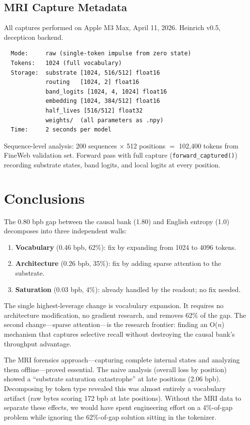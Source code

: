 \documentclass[11pt,a4paper]{report}
\begin{document}
\section{MRI Capture Metadata}

All captures performed on Apple M3 Max, April 11, 2026. Heinrich v0.5, decepticon backend.

\begin{verbatim}
  Mode:     raw (single-token impulse from zero state)
  Tokens:   1024 (full vocabulary)
  Storage:  substrate [1024, 516/512] float16
            routing   [1024, 2] float16
            band_logits [1024, 4, 1024] float16
            embedding [1024, 384/512] float16
            half_lives [516/512] float32
            weights/  (all parameters as .npy)
  Time:     2 seconds per model
\end{verbatim}

Sequence-level analysis: 200 sequences $\times$ 512 positions $=$ 102,400 tokens from FineWeb validation set. Forward pass with full capture (\texttt{forward\_captured()}) recording substrate states, band logits, and local logits at every position.


\chapter{Conclusions}

The 0.80 bpb gap between the causal bank (1.80) and English entropy (1.0) decomposes into three independent walls:

\begin{enumerate}
\item \textbf{Vocabulary} (0.46 bpb, 62\%): fix by expanding from 1024 to 4096 tokens.
\item \textbf{Architecture} (0.26 bpb, 35\%): fix by adding sparse attention to the substrate.
\item \textbf{Saturation} (0.03 bpb, 4\%): already handled by the readout; no fix needed.
\end{enumerate}

The single highest-leverage change is vocabulary expansion. It requires no architecture modification, no gradient research, and removes 62\% of the gap. The second change---sparse attention---is the research frontier: finding an O($n$) mechanism that captures selective recall without destroying the causal bank's throughput advantage.

The MRI forensics approach---capturing complete internal states and analyzing them offline---proved essential. The naive analysis (overall loss by position) showed a ``substrate saturation catastrophe'' at late positions (2.06 bpb). Decomposing by token type revealed this was almost entirely a vocabulary artifact (raw bytes scoring 172 bpb at late positions). Without the MRI data to separate these effects, we would have spent engineering effort on a 4\%-of-gap problem while ignoring the 62\%-of-gap solution sitting in the tokenizer.
\end{document}
